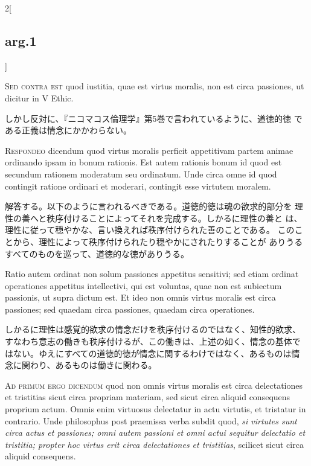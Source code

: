 \documentclass[paper=a4paper,fontsize=10pt,jafontsize=9pt,titlepage]{jlreq}
\begin{document}
\begin{paracol}{2}[\subsection{arg.1}]
\switchcolumn*[\subsection{s.c.}]

{\scshape Sed contra est} quod iustitia, quae est virtus moralis, non
est circa passiones, ut dicitur in V Ethic.

\switchcolumn

しかし反対に、『ニコマコス倫理学』第5巻で言われているように、道徳的徳
である正義は情念にかかわらない。


{\scshape Respondeo} dicendum quod virtus moralis perficit appetitivam
partem animae ordinando ipsam in bonum rationis. Est autem rationis
bonum id quod est secundum rationem moderatum seu ordinatum.  Unde
circa omne id quod contingit ratione ordinari et moderari, contingit
esse virtutem moralem.

\switchcolumn

解答する。以下のように言われるべきである。道徳的徳は魂の欲求的部分を
 理性の善へと秩序付けることによってそれを完成する。しかるに理性の善と
 は、理性に従って穏やかな、言い換えれば秩序付けられた善のことである。
 このことから、理性によって秩序付けられたり穏やかにされたりすることが
 ありうるすべてのものを巡って、道徳的な徳がありうる。

\switchcolumn*

Ratio autem ordinat non solum
passiones appetitus sensitivi; sed etiam ordinat operationes appetitus
intellectivi, qui est voluntas, quae non est subiectum passionis, ut
supra dictum est. Et ideo non omnis virtus moralis est circa
passiones; sed quaedam circa passiones, quaedam circa operationes.

\switchcolumn

しかるに理性は感覚的欲求の情念だけを秩序付けるのではなく、知性的欲求、
すなわち意志の働きも秩序付けるが、この働きは、上述の如く、情念の基体で
はない。ゆえにすべての道徳的徳が情念に関するわけではなく、あるものは情
念に関わり、あるものは働きに関わる。

\switchcolumn*[\subsection{ad.1}]

{\scshape Ad primum ergo dicendum} quod non omnis virtus moralis est
circa delectationes et tristitias sicut circa propriam materiam, sed
sicut circa aliquid consequens proprium actum. Omnis enim virtuosus
delectatur in actu virtutis, et tristatur in contrario. Unde
philosophus post praemissa verba subdit quod, {\itshape si virtutes
sunt circa actus et passiones; omni autem passioni et omni actui
sequitur delectatio et tristitia; propter hoc virtus erit circa
delectationes et tristitias}, scilicet sicut circa aliquid consequens.


\end{paracol}
\end{document}
